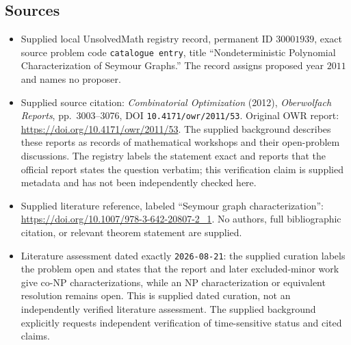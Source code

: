 \documentclass[11pt]{article}
\begin{document}
\subsection{Sources}
\begin{itemize}
\item Supplied local UnsolvedMath registry record, permanent ID \(30001939\), exact source problem code \texttt{catalogue entry}, title ``Nondeterministic Polynomial Characterization of Seymour Graphs.'' The record assigns proposed year \(2011\) and names no proposer.
\item Supplied source citation: \emph{Combinatorial Optimization} (2012), \emph{Oberwolfach Reports}, pp.~3003--3076, DOI \texttt{10.4171/owr/2011/53}. Original OWR report: \url{https://doi.org/10.4171/owr/2011/53}. The supplied background describes these reports as records of mathematical workshops and their open-problem discussions. The registry labels the statement exact and reports that the official report states the question verbatim; this verification claim is supplied metadata and has not been independently checked here.
\item Supplied literature reference, labeled ``Seymour graph characterization'': \url{https://doi.org/10.1007/978-3-642-20807-2_1}. No authors, full bibliographic citation, or relevant theorem statement are supplied.
\item Literature assessment dated exactly \texttt{2026-08-21}: the supplied curation labels the problem open and states that the report and later excluded-minor work give co-NP characterizations, while an NP characterization or equivalent resolution remains open. This is supplied dated curation, not an independently verified literature assessment. The supplied background explicitly requests independent verification of time-sensitive status and cited claims.
\end{itemize}
\end{document}
